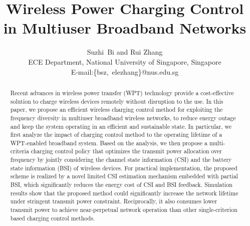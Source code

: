 \documentclass[conference]{IEEEtran}
\begin{document}
\title{Wireless Power Charging Control in Multiuser Broadband Networks}

\author{Suzhi~Bi and Rui Zhang \\
        ECE Department, National University of Singapore, Singapore \\ E-mail:\{bsz,~elezhang\}@nus.edu.sg \vspace{-2ex}}
\maketitle


\vspace{-1.8cm}
\begin{abstract}
Recent advances in wireless power transfer (WPT) technology provide a cost-effective solution to charge wireless devices remotely without disruption to the use. In this paper, we propose an efficient wireless charging control method for exploiting the frequency diversity in multiuser broadband wireless networks, to reduce energy outage and keep the system operating in an efficient and sustainable state. In particular, we first analyze the impact of charging control method to the operating lifetime of a WPT-enabled broadband system. Based on the analysis, we then propose a multi-criteria charging control policy that optimizes the transmit power allocation over frequency by jointly considering the channel state information (CSI) and the battery state information (BSI) of wireless devices. For practical implementation, the proposed scheme is realized by a novel limited CSI estimation mechanism embedded with partial BSI, which significantly reduces the energy cost of CSI and BSI feedback. Simulation results show that the proposed method could significantly increase the network lifetime under stringent transmit power constraint. Reciprocally, it also consumes lower transmit power to achieve near-perpetual network operation than other single-criterion based charging control methods.
\end{abstract}
\end{document}
